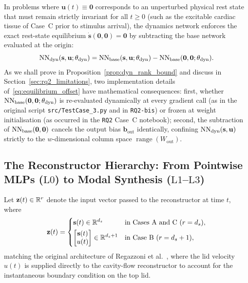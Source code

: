 In problems where $\mathbf{u}(t) \equiv \mathbf{0}$ corresponds to an unperturbed physical rest state that must remain strictly invariant for all $t \ge 0$ (such as the excitable cardiac tissue of Case~C prior to stimulus arrival), the dynamics network enforces the exact rest-state equilibrium $\dot{\mathbf{s}}(\mathbf{0},\mathbf{0}) = \mathbf{0}$ by subtracting the base network evaluated at the origin:
\begin{equation}
  \mathrm{NN}_{\mathrm{dyn}}(\mathbf{s}, \mathbf{u}; \theta_{\mathrm{dyn}}) = \mathrm{NN}_{\mathrm{base}}(\mathbf{s}, \mathbf{u}; \theta_{\mathrm{dyn}}) - \mathrm{NN}_{\mathrm{base}}(\mathbf{0}, \mathbf{0}; \theta_{\mathrm{dyn}}).
  \label{eq:equilibrium_offset}
\end{equation}
As we shall prove in Proposition~\ref{prop:dyn_rank_bound} and discuss in Section~\ref{sec:rq2_limitations}, two implementation details of~\eqref{eq:equilibrium_offset} have mathematical consequences: first, whether $\mathrm{NN}_{\mathrm{base}}(\mathbf{0},\mathbf{0};\theta_{\mathrm{dyn}})$ is re-evaluated dynamically at every gradient call (as in the original script \texttt{src/TestCase\_3.py} and in \texttt{RQ2-bis}) or frozen at weight initialisation (as occurred in the \texttt{RQ2} Case~C notebook); second, the subtraction of $\mathrm{NN}_{\mathrm{base}}(\mathbf{0},\mathbf{0})$ cancels the output bias $\mathbf{b}_{\mathrm{out}}$ identically, confining $\mathrm{NN}_{\mathrm{dyn}}(\mathbf{s},\mathbf{u})$ strictly to the $w$-dimensional column space $\operatorname{range}(W_{\mathrm{out}})$.

\subsection{The Reconstructor Hierarchy: From Pointwise MLPs (\texorpdfstring{$\mathrm{L0}$}{L0}) to Modal Synthesis (\texorpdfstring{$\mathrm{L1}$}{L1}--\texorpdfstring{$\mathrm{L3}$}{L3})}

Let $\mathbf{z}(t) \in \mathbb{R}^r$ denote the input vector passed to the reconstructor at time $t$, where
\begin{equation}
  \mathbf{z}(t) = \begin{dcases}
    \mathbf{s}(t) \in \mathbb{R}^{d_s} & \text{in Cases A and C } (r = d_s), \\
    \begin{bmatrix} \mathbf{s}(t) \\ u(t) \end{bmatrix} \in \mathbb{R}^{d_s + 1} & \text{in Case B } (r = d_s + 1),
  \end{dcases}
\end{equation}
matching the original architecture of Regazzoni et al.~\cite{regazzoni2024learning}, where the lid velocity $u(t)$ is supplied directly to the cavity-flow reconstructor to account for the instantaneous boundary condition on the top lid.

